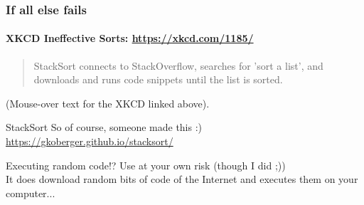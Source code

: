 \begin{frame}
	\frametitle{If all else fails}
	\framesubtitle{XKCD Ineffective Sorts: \url{https://xkcd.com/1185/}}
	\begin{quote}
		StackSort connects to StackOverflow, searches for 'sort a list', and downloads and runs code snippets until the list is sorted.
	\end{quote}
	(Mouse-over text for the XKCD linked above).
	\pause
		\begin{block}{StackSort}
			So of course, someone made this :)\\
			\url{https://gkoberger.github.io/stacksort/}
		\end{block}	
			\begin{block}{Executing random code!?}
				Use at your own risk (though I did ;))\\
				It does download random bits of code of the Internet and executes them on your computer...
			\end{block}	

	
\end{frame}


